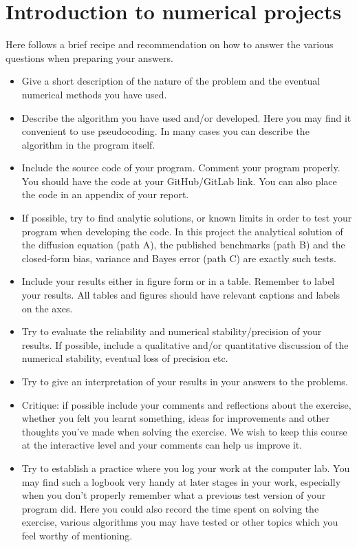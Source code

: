 \documentclass[11pt,a4paper]{article}
\begin{document}
\section*{Introduction to numerical projects}

Here follows a brief recipe and recommendation on how to answer the various
questions when preparing your answers.
\begin{itemize}[nosep]
  \item Give a short description of the nature of the problem and the
        eventual numerical methods you have used.
  \item Describe the algorithm you have used and/or developed.  Here you may
        find it convenient to use pseudocoding.  In many cases you can
        describe the algorithm in the program itself.
  \item Include the source code of your program.  Comment your program
        properly.  You should have the code at your GitHub/GitLab link.  You
        can also place the code in an appendix of your report.
  \item If possible, try to find analytic solutions, or known limits in order
        to test your program when developing the code.  In this project the
        analytical solution of the diffusion equation (path A), the published
        benchmarks (path B) and the closed-form bias, variance and Bayes
        error (path C) are exactly such tests.
  \item Include your results either in figure form or in a table.  Remember
        to label your results.  All tables and figures should have relevant
        captions and labels on the axes.
  \item Try to evaluate the reliability and numerical stability/precision of
        your results.  If possible, include a qualitative and/or quantitative
        discussion of the numerical stability, eventual loss of precision
        etc.
  \item Try to give an interpretation of your results in your answers to the
        problems.
  \item Critique: if possible include your comments and reflections about the
        exercise, whether you felt you learnt something, ideas for
        improvements and other thoughts you've made when solving the
        exercise.  We wish to keep this course at the interactive level and
        your comments can help us improve it.
  \item Try to establish a practice where you log your work at the computer
        lab.  You may find such a logbook very handy at later stages in your
        work, especially when you don't properly remember what a previous
        test version of your program did.  Here you could also record the
        time spent on solving the exercise, various algorithms you may have
        tested or other topics which you feel worthy of mentioning.
\end{itemize}
\end{document}
